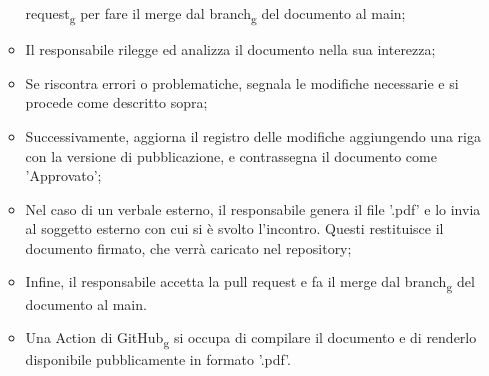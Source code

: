 \begin{itemize}
\begin{itemize}
                        request\textsubscript{g} per fare il merge dal branch\textsubscript{g} del
                        documento al main;
                  \item Il responsabile rilegge ed analizza il documento nella sua interezza;
                  \item Se riscontra errori o problematiche, segnala le modifiche necessarie e si
                        procede come descritto sopra;
                  \item Successivamente, aggiorna il registro delle modifiche aggiungendo una riga con
                        la versione di pubblicazione, e contrassegna il documento come 'Approvato';
                  \item Nel caso di un verbale esterno, il responsabile genera il file '.pdf' e lo
                        invia al soggetto esterno con cui si è svolto l'incontro. Questi restituisce il
                        documento firmato, che verrà caricato nel repository;
                  \item Infine, il responsabile accetta la pull request e fa il merge dal
                        branch\textsubscript{g} del documento al main.
                  \item Una Action di GitHub\textsubscript{g} si occupa di compilare il documento e di
                        renderlo disponibile pubblicamente in formato '.pdf'.
            \end{itemize}
\end{itemize}

\newpage
